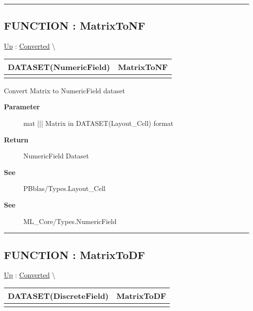 \rule{\linewidth}{0.5pt}
\subsection*{FUNCTION : MatrixToNF}
\hypertarget{ecldoc:pbblas.converted.matrixtonf}{}
\hyperlink{ecldoc:PBblas.Converted}{Up} :
\hspace{0pt} \hyperlink{ecldoc:PBblas.Converted}{Converted} \textbackslash 

{\renewcommand{\arraystretch}{1.5}
\begin{tabularx}{\textwidth}{|>{\raggedright\arraybackslash}l|X|}
\hline
\hspace{0pt}DATASET(NumericField) & MatrixToNF \\
\hline
\multicolumn{2}{|>{\raggedright\arraybackslash}X|}{\hspace{0pt}(DATASET(Layout\_Cell) mat)} \\
\hline
\end{tabularx}
}

\par
Convert Matrix to NumericField dataset

\par
\begin{description}
\item [\textbf{Parameter}] mat ||| Matrix in DATASET(Layout\_Cell) format
\item [\textbf{Return}] NumericField Dataset
\item [\textbf{See}] PBblas/Types.Layout\_Cell
\item [\textbf{See}] ML\_Core/Types.NumericField
\end{description}

\rule{\linewidth}{0.5pt}
\subsection*{FUNCTION : MatrixToDF}
\hypertarget{ecldoc:pbblas.converted.matrixtodf}{}
\hyperlink{ecldoc:PBblas.Converted}{Up} :
\hspace{0pt} \hyperlink{ecldoc:PBblas.Converted}{Converted} \textbackslash 

{\renewcommand{\arraystretch}{1.5}
\begin{tabularx}{\textwidth}{|>{\raggedright\arraybackslash}l|X|}
\hline
\hspace{0pt}DATASET(DiscreteField) & MatrixToDF \\
\hline
\multicolumn{2}{|>{\raggedright\arraybackslash}X|}{\hspace{0pt}(DATASET(Layout\_Cell) mat)} \\
\hline
\end{tabularx}
}

